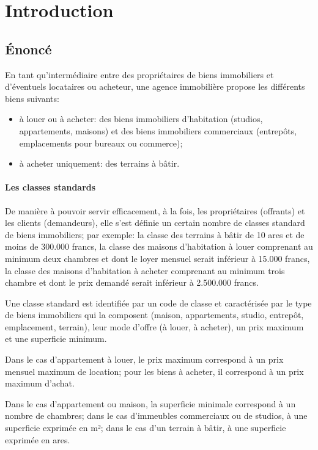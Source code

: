 \chapter{Introduction}

\section{Énoncé}

En tant qu'intermédiaire entre des propriétaires de biens immobiliers et d'éventuels locataires ou acheteur, une agence immobilière propose les différents biens suivants:
\begin{itemize}
  \item à louer ou à acheter: des biens immobiliers d'habitation (studios, appartements, maisons) et des biens immobiliers commerciaux (entrepôts, emplacements pour bureaux ou commerce);
  \item à acheter uniquement: des terrains à bâtir.
\end{itemize}

\subsubsection{Les classes standards}

De manière à pouvoir servir efficacement, à la fois, les propriétaires (offrants) et les clients (demandeurs), elle s'est définie un certain nombre de \og{}classes standard\fg{} de biens immobiliers; par exemple: la classe des terrains à bâtir de 10 ares et de moins de 300.000 francs, la classe des maisons d'habitation à louer comprenant au minimum deux chambres et dont le loyer mensuel serait inférieur à 15.000 francs, la classe des maisons d'habitation à acheter comprenant au minimum trois chambre et dont le prix demandé serait inférieur à 2.500.000 francs.

Une classe standard est identifiée par un code de classe et caractérisée par le type de biens immobiliers qui la composent (maison, appartements, studio, entrepôt, emplacement, terrain), leur mode d'offre (à louer, à acheter), un prix maximum et une superficie minimum.

Dans le cas d'appartement à louer, le prix maximum correspond à un prix mensuel maximum de location; pour les biens à acheter, il correspond à un prix maximum d'achat.

Dans le cas d'appartement ou maison, la superficie minimale correspond à un nombre de chambres; dans le cas d'immeubles commerciaux ou de studios, à une superficie exprimée en m²; dans le cas d'un terrain à bâtir, à une superficie exprimée en ares.

